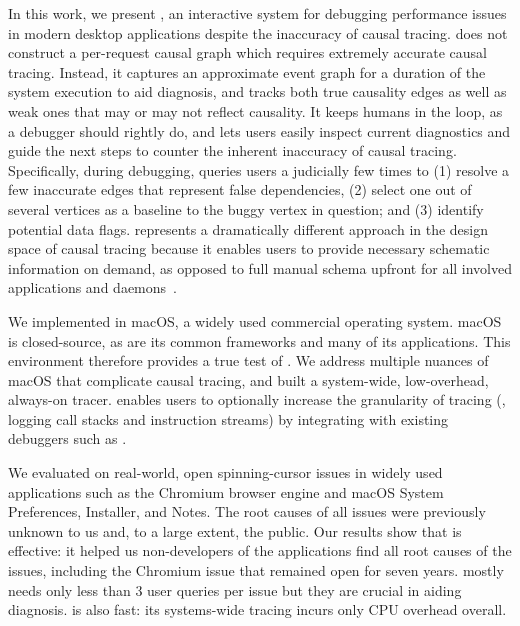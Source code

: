 In this work, we present \xxx, an interactive system for debugging performance
issues in modern desktop applications despite the inaccuracy of causal tracing.
\xxx does not construct a per-request causal graph which requires extremely
accurate causal tracing. Instead, it captures an approximate event graph for
a duration of the system execution to aid diagnosis, and tracks both true
causality edges as well as weak ones that may or may not reflect causality.
It keeps humans in the loop, as a debugger should rightly do, and lets users
easily inspect current diagnostics and guide the next steps to counter the
inherent inaccuracy of causal tracing. Specifically, during debugging, \xxx
queries users a judicially few times to (1) resolve a few inaccurate edges
that represent false dependencies, (2) select one out of several vertices as a
baseline to the buggy vertex in question; and (3) identify potential data flags.
\xxx represents a dramatically different approach in the design space of causal
tracing because it enables users to provide necessary schematic information on
demand, as opposed to full manual schema upfront for all involved applications
and daemons~\cite{barham2004using}.

We implemented \xxx in macOS, a widely used commercial operating system. macOS
is closed-source, as are its common frameworks and many of its applications.
This environment therefore provides a true test of \xxx. We address multiple
nuances of macOS that complicate causal tracing, and built a system-wide,
low-overhead, always-on tracer. \xxx enables users to optionally increase the
granularity of tracing (\eg, logging call stacks and instruction streams) by
integrating with existing debuggers such as .

We evaluated \xxx on \nbug real-world, open spinning-cursor issues in widely
used applications such as the Chromium browser engine and macOS System
Preferences, Installer, and Notes. The root causes of all \nbug issues were
previously unknown to us and, to a large extent, the public. Our results show
that \xxx is effective: it helped us non-developers of the applications find all
root causes of the issues, including the Chromium issue that remained open for
seven years. \xxx mostly needs only less than 3 user queries per issue but they are
crucial in aiding diagnosis. \xxx is also fast: its systems-wide tracing incurs
only \cpuoverhead CPU overhead overall.


